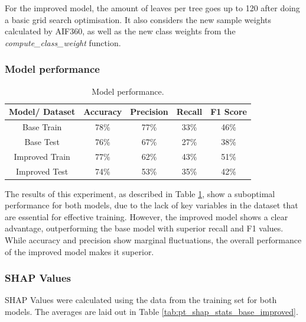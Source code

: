 \documentclass[twoside,11pt]{article}
\begin{document}
For the improved model, the amount of leaves per tree goes up to 120 after doing a basic grid search optimisation. It also considers the new sample weights calculated by AIF360, as well as the new class weights from the \textit{compute\_class\_weight} function.

\subsubsection{Model performance}

\begin{table}[!htb]
\centering
\begin{tabular}{|c|c|c|c|c|}
\hline
        \textbf{Model/ Dataset} & \textbf{Accuracy} & \textbf{Precision} & \textbf{Recall} & \textbf{F1 Score} \\ \hline
        
        Base Train & 78\% & 77\% & 33\% & 46\% \\ 
        Base Test & 76\% & 67\% & 27\% & 38\% \\ 
        Improved Train & 77\% & 62\% & 43\% & 51\% \\ 
        Improved Test & 74\% & 53\% & 35\% & 42\% \\ 
        \hline

    \end{tabular}
\caption{Model performance.}
\label{tab_perf_hfalta:}
\end{table}

The results of this experiment, as described in Table \ref{tab_perf_hfalta:}, show a suboptimal performance for both models, due to the lack of key variables in the dataset that are essential for effective training. However, the improved model shows a clear advantage, outperforming the base model with superior recall and F1 values. While accuracy and precision show marginal fluctuations, the overall performance of the improved model makes it superior.

\subsubsection{SHAP Values}

SHAP Values were calculated using the data from the training set for both models. The averages are laid out in Table \ref{tab:pt_shap_stats_base_improved}.

\clearpage
\end{document}
